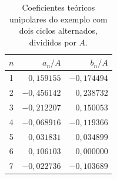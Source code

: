 \begin{table}[H]
\centering
\footnotesize\setlength{\tabcolsep}{3.5pt}
\caption{Coeficientes teóricos unipolares do exemplo com dois ciclos alternados, divididos por $A$.}\label{tab:ret3}
\begin{tabular}{crr}\hline
$n$ & $a_n/A$ & $b_n/A$ \\ \hline
1 & $0{,}159155$ & $-0{,}174494$ \\
2 & $-0{,}456142$ & $0{,}238732$ \\
3 & $-0{,}212207$ & $0{,}150053$ \\
4 & $-0{,}068916$ & $-0{,}119366$ \\
5 & $0{,}031831$ & $0{,}034899$ \\
6 & $0{,}106103$ & $0{,}000000$ \\
7 & $-0{,}022736$ & $-0{,}103689$ \\
\hline\end{tabular}
\end{table}
